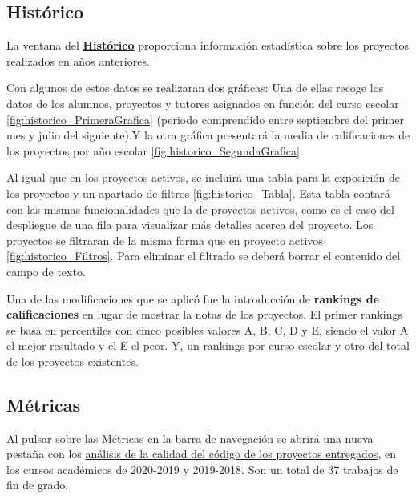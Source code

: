 \subsection{Histórico} 
La ventana del \textbf{\href{https://gestor-tfg-2021.herokuapp.com/Historic}{Histórico}} proporciona información estadística sobre los proyectos realizados en años anteriores. 

Con algunos de estos datos se realizaran dos gráficas: Una de ellas recoge los datos de los alumnos, proyectos y tutores asignados en función del curso escolar \ref{fig:historico_PrimeraGrafica} (periodo comprendido entre septiembre del primer mes y julio del siguiente).Y la otra gráfica presentará la media de calificaciones de los proyectos por año escolar \ref{fig:historico_SegundaGrafica}.


Al igual que en los proyectos activos, se incluirá una tabla para la exposición de los proyectos y un apartado de filtros \ref{fig:historico_Tabla}. Esta tabla contará con las mismas funcionalidades que la de proyectos activos, como es el caso del despliegue de una fila para visualizar más detalles acerca del proyecto. 
Los proyectos se filtraran de la misma forma que en proyecto activos \ref{fig:historico_Filtros}. Para eliminar el filtrado se deberá borrar el contenido del campo de texto.

Una de las modificaciones que se aplicó fue la introducción de \textbf{rankings de calificaciones} en lugar de mostrar la notas de los proyectos. El primer rankings se basa en percentiles con cinco posibles valores A, B, C, D y E, siendo el valor A el mejor resultado y el E el peor. Y, un rankings por curso escolar y otro del total de los proyectos existentes.


\subsection{Métricas} 
Al pulsar sobre las Métricas en la barra de navegación se abrirá una nueva pestaña con los \href{https://sonarcloud.io/organizations/dbo1001/projects/}{análisis de la calidad del código de los proyectos entregados}, en los cursos académicos de 2020-2019 y 2019-2018. Son un total de 37 trabajos de fin de grado.


